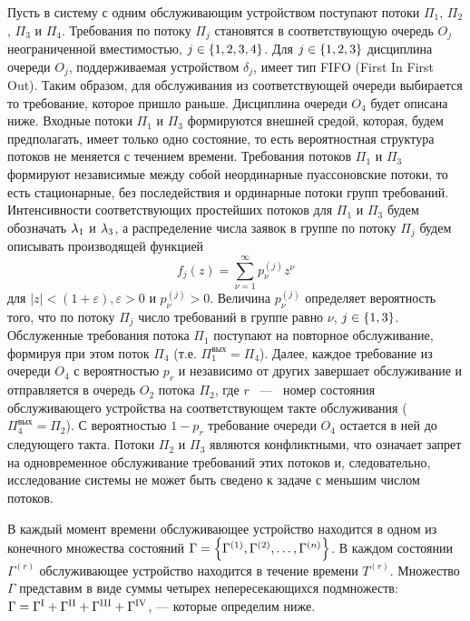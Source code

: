 \documentclass[a4paper,14pt,russian]{article}
\newcommand{\G}{\Gamma}
\newcommand{\Gr}[1]{\Gamma^{(#1)}}
\newcommand{\ga}[1]{\Gamma^{\left( #1 \right)} }
\newcommand{\Tt}[1]{T^{\left( #1 \right)} }
\begin{document}
Пусть в систему с одним обслуживающим устройством поступают потоки $\Pi_1$, $\Pi_2$, $\Pi_3$  и $\Pi_4$. Требования по потоку $\Pi_j$ становятся в соответствующую очередь $O_j$ неограниченной вместимостью, $j\in \left\{1, 2, 3, 4\right\}$. Для $j \in \left\{1, 2, 3\right\}$ дисциплина очереди $O_j$, поддерживаемая устройством $\delta_j$, имеет тип FIFO (First In First Out). Таким образом, для обслуживания из соответствующей очереди выбирается то требование, которое пришло раньше. Дисциплина очереди $O_4$ будет описана ниже. Входные потоки $\Pi_1$ и $\Pi_3$ формируются внешней средой, которая, будем предполагать, имеет только одно состояние, то есть вероятностная структура потоков не меняется с течением времени. Требования потоков $\Pi_1$ и $\Pi_3$ формируют независимые между собой неординарные пуассоновские потоки, то есть  стационарные, без последействия и ординарные потоки групп требований. Интенсивности соответствующих простейших потоков для $\Pi_1$ и $\Pi_3$ будем обозначать $\lambda_1$ и $\lambda_3$, а распределение числа заявок в группе по потоку $\Pi_j$ будем описывать производящей функцией
\begin{equation}
f_j(z) = \sum_{\nu=1}^{\infty} p_{\nu}^{(j)} z ^{\nu}
\end{equation}
 для $|z|<(1+\varepsilon), \varepsilon > 0$ и $p_{\nu}^{(j)}>0$. Величина $p_{\nu}^{(j)}$ определяет вероятность того, что по потоку $\Pi_j$ число требований в группе равно $\nu$, $j\in \left\{1,3\right\}$. Обслуженные требования потока $\Pi_1$ поступают на повторное обслуживание, формируя при этом поток $\Pi_4$ (т.е. $\Pi_1^{\mathrm{\text{вых}}} =  \Pi_4$). Далее, каждое требование из очереди $O_4$ с вероятностью $p_r$ и независимо от других завершает обслуживание и отправляется в очередь $O_2$ потока $\Pi_2$, где $r$~ ---~ номер состояния обслуживающего устройства на соответствующем такте обслуживания ($\Pi_4^{\mathrm{\text{вых}}}=\Pi_2$). С вероятностью $1-p_r$ требование очереди $O_4$ остается в ней до следующего такта. Потоки $\Pi_2$ и $\Pi_3$ являются конфликтными, что означает запрет на одновременное обслуживание требований этих потоков и, следовательно, исследование системы не может быть сведено к задаче с меньшим числом потоков. 
 
 В каждый момент времени обслуживающее устройство находится в одном из конечного множества состояний $\Gamma=\brrr{\Gr{1}, \Gr{2}, \ldots, \Gr{n}}$. В каждом состоянии $\ga{r}$ обслуживающее устройство находится в течение времени $\Tt{r}$. Множество $\G$ представим в виде суммы четырех непересекающихся подмножеств: $\G = \G^{\mathrm{\Rmnum{1}}} + \G^{\mathrm{\Rmnum{2}}} + \G^{\mathrm{\Rmnum{3}}} + \G^{\mathrm{\Rmnum{4}}}$, --- которые определим ниже.
\end{document}
